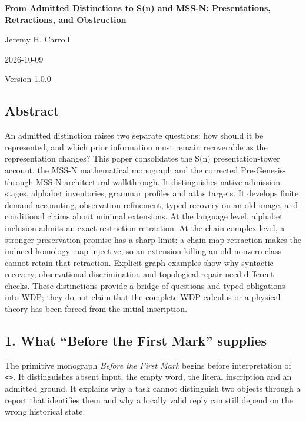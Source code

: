 \documentclass[
  11pt,
]{article}
\author{}
\date{}
\begin{document}
\begin{center}
{\LARGE\bfseries From Admitted Distinctions to S(n) and MSS-N: Presentations, Retractions, and Obstruction\par}
Jeremy H. Carroll\par
2026-10-09\par
Version 1.0.0\par
\end{center}

\subsection{Abstract}\label{abstract}

An admitted distinction raises two separate questions: how should it be
represented, and which prior information must remain recoverable as the
representation changes? This paper consolidates the S(n)
presentation-tower account, the MSS-N mathematical monograph and the
corrected Pre-Genesis-through-MSS-N architectural walkthrough. It
distinguishes native admission stages, alphabet inventories, grammar
profiles and atlas targets. It develops finite demand accounting,
observation refinement, typed recovery on an old image, and conditional
claims about minimal extensions. At the language level, alphabet
inclusion admits an exact restriction retraction. At the chain-complex
level, a stronger preservation promise has a sharp limit: a chain-map
retraction makes the induced homology map injective, so an extension
killing an old nonzero class cannot retain that retraction. Explicit
graph examples show why syntactic recovery, observational discrimination
and topological repair need different checks. These distinctions provide
a bridge of questions and typed obligations into WDP; they do not claim
that the complete WDP calculus or a physical theory has been forced from
the initial inscription.

\subsection{1. What ``Before the First Mark''
supplies}\label{what-before-the-first-mark-supplies}

The primitive monograph \emph{Before the First Mark} begins before
interpretation of \texttt{\textless{}\textgreater{}}. It distinguishes
absent input, the empty word, the literal inscription and an admitted
ground. It explains why a task cannot distinguish two objects through a
report that identifies them and why a locally valid reply can still
depend on the wrong historical state.
\end{document}
